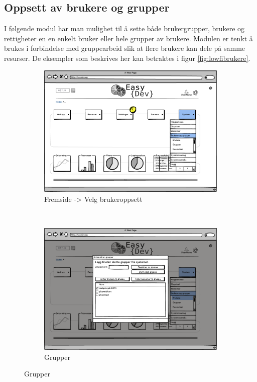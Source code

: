 \subsection{Oppsett av brukere og grupper}
I følgende modul har man mulighet til å sette både brukergrupper, brukere og rettigheter en en enkelt bruker eller hele grupper av brukere. Modulen er tenkt å brukes i forbindelse med gruppearbeid slik at flere brukere kan dele på samme resurser. De eksempler som beskrives her kan betraktes i figur \ref{fig:lowfibrukere}. 
\begin{figure}[h]
        \centering
        \begin{subfigure}[b]{0.48\textwidth}
                \includegraphics[width=\textwidth]
                {./img/prosessdokumentasjon/lowfi/b1.png}
                \caption{Fremside -> Velg brukeroppsett}
                \label{fig:brukere1}
        \end{subfigure}%
        ~ %
        \begin{subfigure}[b]{0.48\textwidth}
                \includegraphics[width=\textwidth]
                {./img/prosessdokumentasjon/lowfi/b2.png}
                \caption{Grupper}
                \label{fig:brukere2}
        \end{subfigure}
       

\end{figure}
